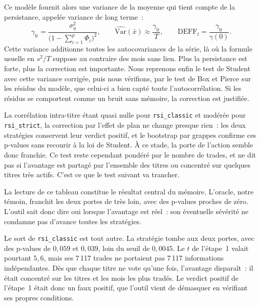 Ce modèle fournit alors une variance de la moyenne qui tient compte de
la persistance, appelée variance de long terme~:
\[
  \gamma_{\mathrm{lr}}
     = \frac{\sigma^2_\eta}{\bigl(1-\sum_{i=1}^{p}\Phi_i\bigr)^{2}},
  \qquad
  \widehat{\mathrm{Var}}(\bar x) \approx \frac{\gamma_{\mathrm{lr}}}{T},
  \qquad
  \mathrm{DEFF}_t = \frac{\gamma_{\mathrm{lr}}}{\gamma(0)} .
\]
Cette variance additionne toutes les autocovariances de la série, là où
la formule usuelle en $s^2/T$ suppose au contraire des mois sans lien.
Plus la persistance est forte, plus la correction est importante. Nous
reprenons enfin le test de Student avec cette variance corrigée, puis
nous vérifions, par le test de Box et Pierce sur les résidus du modèle,
que celui-ci a bien capté toute l'autocorrélation. Si les résidus se
comportent comme un bruit sans mémoire, la correction est justifiée.




La corrélation intra-titre étant quasi nulle pour \texttt{rsi\_classic}
et modérée pour \texttt{rsi\_strict}, la correction par l'effet de plan
ne change presque rien~: les deux stratégies conservent leur verdict
positif, et le bootstrap par grappes confirme ces p-values sans recourir
à la loi de Student. À ce stade, la porte de l'action semble donc
franchie. Ce test reste cependant pondéré par le nombre de trades, et ne
dit pas si l'avantage est partagé par l'ensemble des titres ou concentré
sur quelques titres très actifs. C'est ce que le test suivant va
trancher.



La lecture de ce tableau constitue le résultat central du mémoire.
L'oracle, notre témoin, franchit les deux portes de très loin, avec des
p-values proches de zéro. L'outil sait donc dire oui lorsque l'avantage
est réel~: son éventuelle sévérité ne condamne pas d'avance toutes les
stratégies.

Le sort de \texttt{rsi\_classic} est tout autre. La stratégie tombe aux
deux portes, avec des p-values de $0{,}059$ et $0{,}039$, loin du seuil
de $0{,}0045$. Le \(t\) de l'étape~1 valait pourtant $5{,}6$, mais ses
7\,117 trades ne portaient pas 7\,117 informations indépendantes. Dès
que chaque titre ne vote qu'une fois, l'avantage disparaît~: il était
concentré sur les titres et les mois les plus tradés. Le verdict positif
de l'étape~1 était donc un faux positif, que l'outil vient de démasquer
en vérifiant ses propres conditions.

